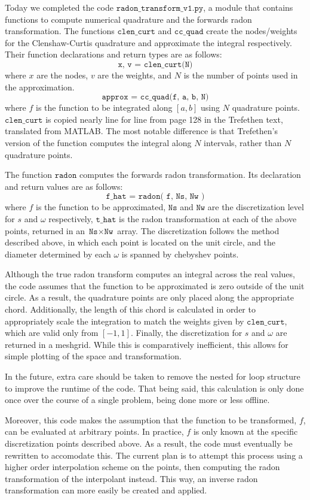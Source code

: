 
Today we completed the code $\texttt{radon\_transform\_v1.py}$, a module that contains functions to compute numerical quadrature and the forwards radon transformation.
The functions $\texttt{clen\_curt}$ and $\texttt{cc\_quad}$ create the nodes/weights for the Clenshaw-Curtis quadrature and approximate the integral respectively.
Their function declarations and return types are as follows:
$$\texttt{x, v = clen\_curt(N)}$$
where $x$ are the nodes, $v$ are the weights, and $N$ is the number of points used in the approximation.
$$\texttt{approx = cc\_quad(f, a, b, N)}$$
where $f$ is the function to be integrated along $[a, b]$ using $N$ quadrature points.
$\texttt{clen\_curt}$ is copied nearly line for line from page 128 in the Trefethen text, translated from MATLAB.
The most notable difference is that Trefethen's version of the function computes the integral along $N$ intervals, rather than $N$ quadrature points.


The function $\texttt{radon}$ computes the forwards radon transformation.
Its declaration and return values are as follows:
$$\texttt{f\_hat = radon( f, Ns, Nw )}$$
where $f$ is the function to be approximated, $\texttt{Ns}$ and $\texttt{Nw}$ are the discretization level for $s$ and $\omega$ respectively, $\texttt{t\_hat}$ is the radon transformation at each of the above points, returned in an $\texttt{Ns}\times\texttt{Nw}$ array.
The discretization follows the method described above, in which each point is located on the unit circle, and the diameter determined by each $\omega$ is spanned by chebyshev points. 

Although the true radon transform computes an integral across the real values, the code assumes that the function to be approximated is zero outside of the unit circle.
As a result, the quadrature points are only placed along the appropriate chord.
Additionally, the length of this chord is calculated in order to appropriately scale the integration to match the weights given by $\texttt{clen\_curt}$, which are valid only from $[-1, 1]$. 
Finally, the discretization for $s$ and $\omega$ are returned in a meshgrid.
While this is comparatively inefficient, this allows for simple plotting of the space and transformation.

In the future, extra care should be taken to remove the nested for loop structure to improve the runtime of the code.
That being said, this calculation is only done once over the course of a single problem, being done more or less offline.

Moreover, this code makes the assumption that the function to be transformed, $f$, can be evaluated at arbitrary points. In practice, $f$ is only known at the specific discretization points described above.
As a result, the code must eventually be rewritten to accomodate this.
The current plan is to attempt this process using a higher order interpolation scheme on the points, then computing the radon transformation of the interpolant instead.
This way, an inverse radon transformation can more easily be created and applied.
